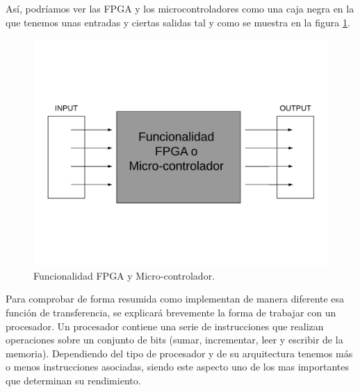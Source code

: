 Así, podríamos ver las FPGA y los microcontroladores como una caja negra en la que tenemos unas entradas y ciertas salidas tal y como se muestra en la figura \ref{fig:funcionalidad_FPGA_micro}.\newline


\begin{figure}[H]
	\center
	\includegraphics[trim = 0mm 30mm 0mm 30mm, clip,scale=0.4]{imagenes/EstadoArte/funcionalidad_FPGA_micro.pdf}
	\caption{Funcionalidad FPGA y Micro-controlador.}
	\label{fig:funcionalidad_FPGA_micro}
\end{figure}

Para comprobar de forma resumida como implementan de manera diferente esa función de transferencia, se explicará brevemente la forma de trabajar con un procesador. \newline
Un procesador contiene una serie de instrucciones que realizan operaciones sobre un conjunto de bits (sumar, incrementar, leer y escribir de la memoria). Dependiendo del tipo de procesador y de su arquitectura tenemos más o menos instrucciones asociadas, siendo este aspecto uno de los mas importantes que determinan su rendimiento.

